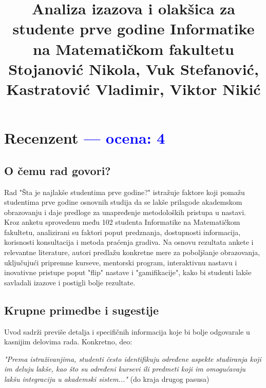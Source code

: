\documentclass[a4paper]{report}
\newcommand{\odgovor}[1]{\textcolor{blue}{#1}}
\begin{document}
\title{Analiza izazova i olakšica za studente prve godine Informatike na  Matematičkom fakultetu\\ \small{Stojanović Nikola, Vuk Stefanović, Kastratović Vladimir, Viktor Nikić}}

\maketitle

\tableofcontents

\chapter{Recenzent \odgovor{--- ocena: 4} }


\section{O čemu rad govori?}

Rad "Šta je najlakše studentima prve godine?" istražuje faktore koji pomažu studentima prve godine osnovnih studija da se lakše prilagode akademskom obrazovanju i daje predloge za unapređenje metodoloških pristupa u nastavi. Kroz anketu sprovedenu među 102 studenta Informatike na Matematičkom fakultetu, analizirani su faktori poput predznanja, dostupnosti informacija, korisnosti konsultacija i metoda praćenja gradiva. Na osnovu rezultata ankete i relevantne literature, autori predlažu konkretne mere za poboljšanje obrazovanja, uključujući pripremne kurseve, mentorski program, interaktivnu nastavu i inovativne pristupe poput "flip" nastave i "gamifikacije", kako bi studenti lakše savladali izazove i postigli bolje rezultate.


\section{Krupne primedbe i sugestije}

Uvod sadrži previše detalja i specifičnih informacija koje bi bolje odgovarale u kasnijim delovima rada. Konkretno, deo:

\textit{"Prema istraživanjima, studenti često identifikuju određene aspekte studiranja koji im deluju lakše, kao što su određeni kursevi ili predmeti koji im omogućavaju lakšu integraciju u akademski sistem..."} (do kraja drugog pasusa)
\end{document}
